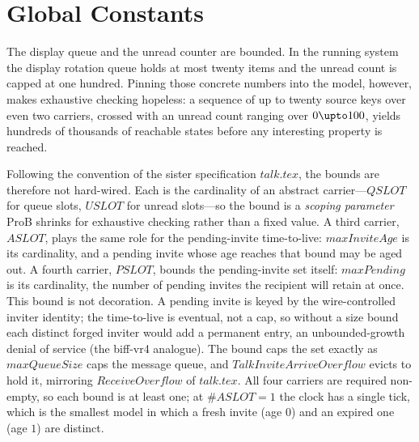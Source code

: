 \documentclass[a4paper,10pt,fleqn]{article}
\begin{document}
\section{Global Constants}

The display queue and the unread counter are bounded.  In the running
system the display rotation queue holds at most twenty items and the
unread count is capped at one hundred.  Pinning those concrete numbers
into the model, however, makes exhaustive checking hopeless: a sequence
of up to twenty source keys over even two carriers, crossed with an
unread count ranging over $0 \upto 100$, yields hundreds of thousands
of reachable states before any interesting property is reached.

Following the convention of the sister specification $talk.tex$, the
bounds are therefore not hard-wired.  Each is the cardinality of an
abstract carrier---$QSLOT$ for queue slots, $USLOT$ for unread slots---so
the bound is a \emph{scoping parameter} ProB shrinks for exhaustive
checking rather than a fixed value.  A third carrier, $ASLOT$, plays the
same role for the pending-invite time-to-live: $maxInviteAge$ is its
cardinality, and a pending invite whose age reaches that bound may be
aged out.  A fourth carrier, $PSLOT$, bounds the pending-invite set
itself: $maxPending$ is its cardinality, the number of pending invites
the recipient will retain at once.  This bound is not decoration.  A
pending invite is keyed by the wire-controlled inviter identity; the
time-to-live is eventual, not a cap, so without a size bound each
distinct forged inviter would add a permanent entry, an
unbounded-growth denial of service (the biff-vr4 analogue).  The bound
caps the set exactly as $maxQueueSize$ caps the message queue, and
$TalkInviteArriveOverflow$ evicts to hold it, mirroring $ReceiveOverflow$
of $talk.tex$.  All four carriers are required non-empty, so each bound
is at least one; at $\# ASLOT = 1$ the clock has a single tick, which is
the smallest model in which a fresh invite (age $0$) and an expired one
(age $1$) are distinct.

\begin{zed}
\end{zed}
\end{document}
